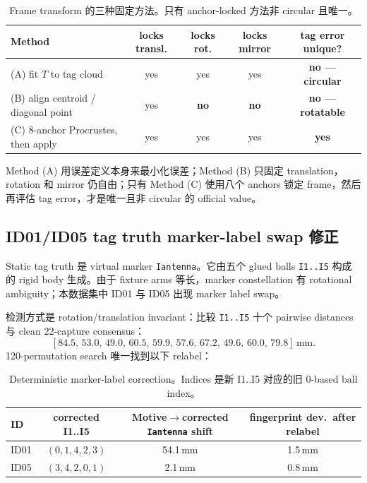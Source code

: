 \documentclass[11pt,a4paper]{article}
\newcommand{\mm}{\,\si{\milli\meter}}
\begin{document}
\begin{table}[h]
\centering
\caption{Frame transform 的三种固定方法。只有 anchor-locked 方法非 circular 且唯一。}
\begin{tabular}{p{4.4cm}cccc}
\toprule
Method & locks transl. & locks rot. & locks mirror & tag error unique? \\
\midrule
(A) fit $T$ to tag cloud            & yes & yes & yes & \textbf{no --- circular} \\
(B) align centroid / diagonal point & yes & \textbf{no} & \textbf{no} & \textbf{no --- rotatable} \\
(C) 8-anchor Procrustes, then apply & yes & yes & yes & \textbf{yes} \\
\bottomrule
\end{tabular}
\end{table}

\noindent
Method (A) 用误差定义本身来最小化误差；Method (B) 只固定 translation，rotation 和 mirror
仍自由；只有 Method (C) 使用八个 anchors 锁定 frame，然后再评估 tag error，才是唯一且非
circular 的 official value。

\subsection{ID01/ID05 tag truth marker-label swap 修正}
\label{sec:swap}
Static tag truth 是 virtual marker \texttt{Iantenna}。它由五个 glued balls \texttt{I1..I5}
构成的 rigid body 生成。由于 fixture arms 等长，marker constellation 有 rotational
ambiguity；本数据集中 ID01 与 ID05 出现 marker label swap。

检测方式是 rotation/translation invariant：比较 \texttt{I1..I5} 十个 pairwise distances
与 clean 22-capture consensus：
\[
[84.5,\,53.0,\,49.0,\,60.5,\,59.9,\,57.6,\,67.2,\,49.6,\,60.0,\,79.8]\mm.
\]
120-permutation search 唯一找到以下 relabel：

\begin{table}[h]
\centering
\caption{Deterministic marker-label correction。Indices 是新 I1..I5 对应的旧 0-based ball index。}
\begin{tabular}{lccc}
\toprule
ID & corrected I1..I5 & Motive$\to$corrected \texttt{Iantenna} shift & fingerprint dev.\ after relabel \\
\midrule
ID01 & $(0,1,4,2,3)$ & 54.1\mm & 1.5\mm \\
ID05 & $(3,4,2,0,1)$ & 2.1\mm  & 0.8\mm \\
\bottomrule
\end{tabular}
\end{table}
\end{document}
